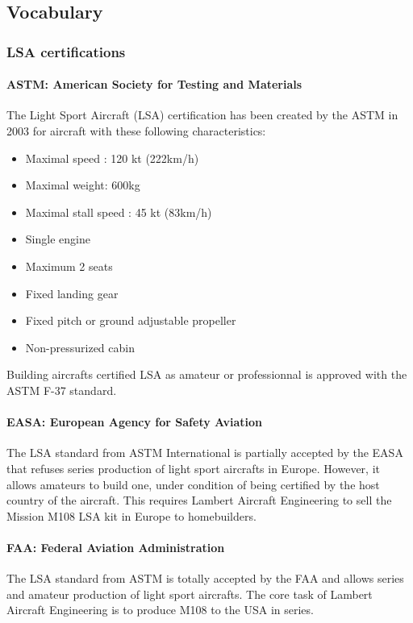 \documentclass[11pt,a4paper]{report}
\begin{document}
\subsection{Vocabulary} %
\subsubsection{LSA certifications}
\paragraph{ASTM: American Society for Testing and Materials}
The Light Sport Aircraft (LSA) certification has been created by the ASTM in 2003 for aircraft with these following characteristics:
\begin{itemize}
\item Maximal speed : 120 kt (222km/h)
\item Maximal weight: 600kg
\item Maximal stall speed : 45 kt (83km/h)
\item Single engine
\item Maximum 2 seats
\item Fixed landing gear
\item Fixed pitch or ground adjustable propeller
\item Non-pressurized cabin
\end{itemize}

\bigskip

Building aircrafts certified LSA as amateur or professionnal is approved with the ASTM F-37 standard.

\paragraph{EASA: European Agency for Safety Aviation}
The LSA standard from ASTM International is partially accepted by the EASA that refuses series production of light sport aircrafts in Europe. However, it allows amateurs to build one, under condition of being certified by the host country of the aircraft. This requires Lambert Aircraft Engineering to sell the Mission M108 LSA kit in Europe to homebuilders.

\paragraph{FAA: Federal Aviation Administration}
The LSA standard from ASTM is totally accepted by the FAA and allows series and amateur production of light sport aircrafts. The core task of Lambert Aircraft Engineering is to produce M108 to the USA in series.
\end{document}
